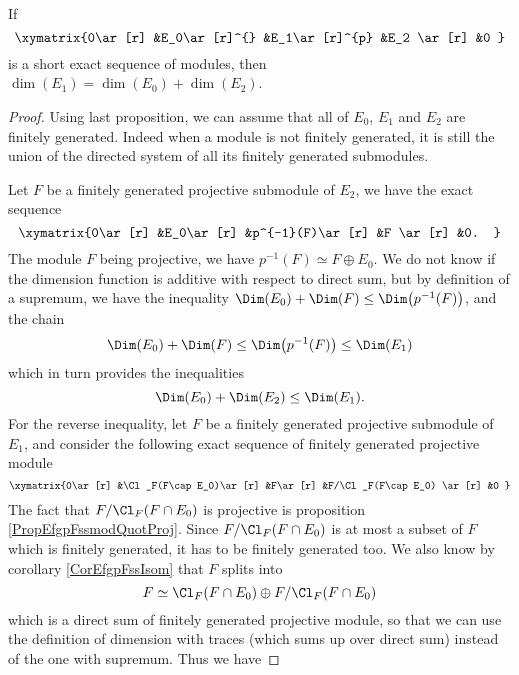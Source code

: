 \begin{proposition}
If
\begin{equation}
	\xymatrix{%
   0\ar[r] 	&E_0\ar[r]^{}	&E_1\ar[r]^{p}	&E_2 \ar[r]	&0	
}
\end{equation}
is a short exact sequence of modules, then $\dim(E_1)=\dim(E_0)+\dim(E_2)$.
\end{proposition}

\begin{proof}
Using last proposition, we can assume that all of $E_0$, $E_1$ and $E_2$ are finitely generated. Indeed when a module is not finitely generated, it is still the union of the directed system of all its finitely generated submodules.

Let $F$ be a finitely generated projective submodule of $E_2$, we have the exact sequence
\begin{equation}
	\xymatrix{%
   0\ar[r] 	&E_0\ar[r]	&p^{-1}(F)\ar[r]	&F \ar[r]	&0.
}
\end{equation}
The module $F$ being projective, we have $p^{-1}(F)\simeq F\oplus E_0$. We do not know if the dimension function is additive with respect to direct sum, but by definition of a supremum, we have the inequality $\Dim(E_0)+\Dim(F)\leq \Dim\big( p^{-1}(F) \big)$, and the chain
\begin{equation}
	\Dim(E_0)+\Dim(F)\leq \Dim\big( p^{-1}(F) \big)\leq\Dim(E_1)
\end{equation}
which in turn provides the inequalities
\begin{equation}
	\Dim(E_0)+\Dim(E_2)\leq\Dim(E_1).
\end{equation}
For the reverse inequality, let $F$ be a finitely generated projective submodule of $E_1$, and consider the following exact sequence of finitely generated projective module
\begin{equation}
	\xymatrix{%
   0\ar[r] 	&\Cl_F(F\cap E_0)\ar[r]	&F\ar[r]	&F/\Cl_F(F\cap E_0) \ar[r]	&0	
}
\end{equation}
The fact that $F/\Cl_F(F\cap E_0)$ is projective is proposition \ref{PropEfgpFssmodQuotProj}. Since $F/\Cl_F(F\cap E_0)$ is at most a subset of $F$ which is finitely generated, it has to be finitely generated too. We also know by corollary \ref{CorEfgpFssIsom} that $F$ splits into
\begin{equation}
	F\simeq \Cl_F(F\cap E_0)\oplus F/\Cl_F(F\cap E_0)
\end{equation}
which is a direct sum of finitely generated projective module, so that we can use the definition of dimension with traces (which sums up over direct sum) instead of the one with supremum. Thus we have

\end{proof}
